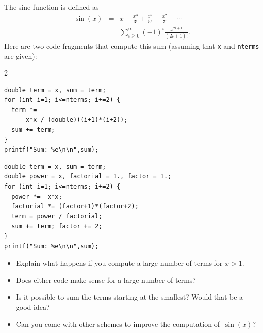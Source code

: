 
\begin{exercise}
  \label{ex:sine-power}
  The sine function is defined as
  \begin{equation}
  \begin{array}{rcl}
    \sin(x) &=& x-\frac{x^3}{3!} + \frac{x^5}{5!} - \frac{x^7}{7!} + \cdots\\
    &=& \sum_{i\geq 0}^\infty (-1)^{i}\frac{x^{2i+1}}{(2i+1)!}.
  \end{array}
  \end{equation}
  Here are two code fragments that compute this sum (assuming that \lstinline{x}
  and \lstinline{nterms} are given):
  \begin{multicols}{2}
\unitindent=0pt \scriptsize %
\begin{lstlisting}
double term = x, sum = term;
for (int i=1; i<=nterms; i+=2) {
  term *= 
    - x*x / (double)((i+1)*(i+2));
  sum += term;
}
printf("Sum: %e\n\n",sum);
\end{lstlisting}
\columnbreak
\begin{lstlisting}
double term = x, sum = term;
double power = x, factorial = 1., factor = 1.;
for (int i=1; i<=nterms; i+=2) {
  power *= -x*x;
  factorial *= (factor+1)*(factor+2);
  term = power / factorial;
  sum += term; factor += 2;
}
printf("Sum: %e\n\n",sum);
\end{lstlisting}
  \end{multicols}
  \begin{itemize}
  \item
    Explain what happens if you compute a large number of terms for
    $x>1$.
  \item Does either code make sense for a large number of terms?
  \item Is it possible to sum the terms starting at the smallest?
    Would that be a good idea?
  \item Can you come with other schemes to improve the computation
    of~$\sin(x)$?
  \end{itemize}
\end{exercise}

